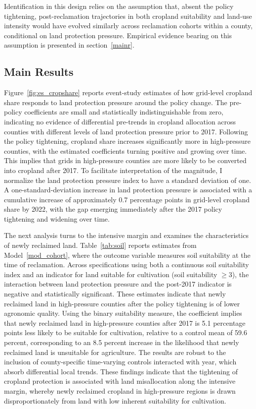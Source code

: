 Identification in this design relies on the assumption that, absent the policy tightening, post-reclamation trajectories in both cropland suitability and land-use intensity would have evolved similarly across reclamation cohorts within a county, conditional on land protection pressure. Empirical evidence bearing on this assumption is presented in section~\ref{mainr}.



\subsection{Main Results\label{mainr}}

Figure~\ref{fig:es_cropshare} reports event-study estimates of how grid-level cropland share responds to land protection pressure around the policy change. The pre-policy coefficients are small and statistically indistinguishable from zero, indicating no evidence of differential pre-trends in cropland allocation across counties with different levels of land protection pressure prior to 2017. Following the policy tightening, cropland share increases significantly more in high-pressure counties, with the estimated coefficients turning positive and growing over time. This implies that grids in high-pressure counties are more likely to be converted into cropland after 2017. To facilitate interpretation of the magnitude, I normalize the land protection pressure index to have a standard deviation of one. A one-standard-deviation increase in land protection pressure is associated with a cumulative increase of approximately 0.7 percentage points in grid-level cropland share by 2022, with the gap emerging immediately after the 2017 policy tightening and widening over time.

The next analysis turns to the intensive margin and examines the characteristics of newly reclaimed land. Table~\ref{tab:soil} reports estimates from Model~\ref{mod_cohort}, where the outcome variable measures soil suitability at the time of reclamation. Across specifications using both a continuous soil suitability index and an indicator for land suitable for cultivation (soil suitability $\geq 3$), the interaction between land protection pressure and the post-2017 indicator is negative and statistically significant. These estimates indicate that newly reclaimed land in high-pressure counties after the policy tightening is of lower agronomic quality. Using the binary suitability measure, the coefficient implies that newly reclaimed land in high-pressure counties after 2017 is 5.1 percentage points less likely to be suitable for cultivation, relative to a control mean of 59.6 percent, corresponding to an 8.5 percent increase in the likelihood that newly reclaimed land is unsuitable for agriculture. The results are robust to the inclusion of county-specific time-varying controls interacted with year, which absorb differential local trends. These findings indicate that the tightening of cropland protection is associated with land misallocation along the intensive margin, whereby newly reclaimed cropland in high-pressure regions is drawn disproportionately from land with low inherent suitability for cultivation.





